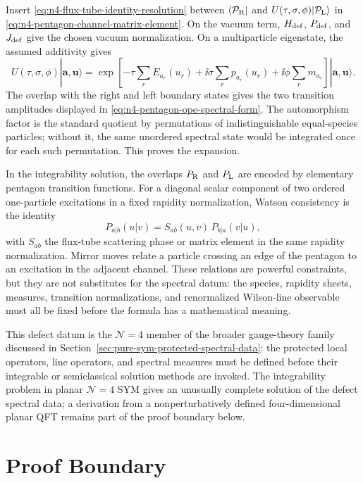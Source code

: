 Insert \eqref{eq:n4-flux-tube-identity-resolution} between
\(\langle\mathcal P_{\rm R}|\) and
\(U(\tau,\sigma,\phi)|\mathcal P_{\rm L}\rangle\) in
\eqref{eq:n4-pentagon-channel-matrix-element}.  On the vacuum term,
\(H_{\rm def}\), \(P_{\rm def}\), and \(J_{\rm def}\) give the chosen vacuum
normalization.  On a multiparticle eigenstate, the assumed additivity gives
\[
  U(\tau,\sigma,\phi)|\mathbf a,\mathbf u\rangle
  =
  \exp\!\left[
    -\tau\sum_rE_{a_r}(u_r)
    +\ii\sigma\sum_rp_{a_r}(u_r)
    +\ii\phi\sum_rm_{a_r}
  \right]
  |\mathbf a,\mathbf u\rangle .
\]
The overlap with the right and left boundary states gives the two transition
amplitudes displayed in
\eqref{eq:n4-pentagon-ope-spectral-form}.  The automorphism factor is the
standard quotient by permutations of indistinguishable equal-species
particles; without it, the same unordered spectral state would be integrated
once for each such permutation.  This proves the expansion.

In the integrability solution, the overlaps
\(P_{\rm R}\) and \(P_{\rm L}\) are encoded by elementary pentagon transition
functions.  For a diagonal scalar component of two ordered one-particle
excitations in a fixed rapidity normalization, Watson consistency is the
identity
\begin{equation}
  P_{a|b}(u|v)
  =
  S_{ab}(u,v)\,P_{b|a}(v|u),
  \label{eq:n4-pentagon-watson-diagonal}
\end{equation}
with \(S_{ab}\) the flux-tube scattering phase or matrix element in the same
rapidity normalization.  Mirror moves relate a particle crossing an edge of
the pentagon to an excitation in the adjacent channel.  These relations are
powerful constraints, but they are not substitutes for the spectral datum:
the species, rapidity sheets, measures, transition normalizations, and
renormalized Wilson-line observable must all be fixed before the formula has
a mathematical meaning.

This defect datum is the \(\mathcal N=4\) member of the broader
gauge-theory family discussed in
Section~\ref{sec:pure-sym-protected-spectral-data}: the protected local
operators, line operators, and spectral measures must be defined before
their integrable or semiclassical solution methods are invoked.  The
integrability problem in planar \(\mathcal N=4\) SYM gives an unusually
complete solution of the defect spectral data; a derivation from a
nonperturbatively defined four-dimensional planar QFT remains part of the
proof boundary below.

\section{Proof Boundary}

